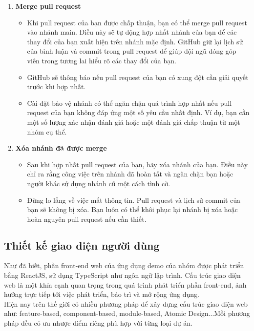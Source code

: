 \begin{enumerate}
    \item \textbf{Merge pull request}
    \begin{itemize}
        \item Khi pull request của bạn được chấp thuận, bạn có thể merge pull request vào nhánh main. Điều này sẽ tự động hợp nhất nhánh của bạn để các thay đổi của bạn xuất hiện trên nhánh mặc định. GitHub giữ lại lịch sử của bình luận và commit trong pull request để giúp đội ngũ đóng góp viên trong tương lai hiểu rõ các thay đổi của bạn.
        \item GitHub sẽ thông báo nếu pull request của bạn có xung đột cần giải quyết trước khi hợp nhất. 
        \item Cài đặt bảo vệ nhánh có thể ngăn chặn quá trình hợp nhất nếu pull request của bạn không đáp ứng một số yêu cầu nhất định. Ví dụ, bạn cần một số lượng xác nhận đánh giá hoặc một đánh giá chấp thuận từ một nhóm cụ thể.
    \end{itemize}

    \item \textbf{Xóa nhánh đã được merge}
    \begin{itemize}
        \item Sau khi hợp nhất pull request của bạn, hãy xóa nhánh của bạn. Điều này chỉ ra rằng công việc trên nhánh đã hoàn tất và ngăn chặn bạn hoặc người khác sử dụng nhánh cũ một cách tình cờ.
        \item Đừng lo lắng về việc mất thông tin. Pull request và lịch sử commit của bạn sẽ không bị xóa. Bạn luôn có thể khôi phục lại nhánh bị xóa hoặc hoàn nguyên pull request nếu cần thiết.
    \end{itemize}    
\end{enumerate}

\subsection{Thiết kế giao diện người dùng}
Như đã biết, phần front-end web của ứng dụng demo của nhóm được phát triển bằng ReactJS, sử dụng TypeScript như ngôn ngữ lập trình. Cấu trúc giao diện web là một khía cạnh quan trọng trong quá trình phát triển phần front-end, ảnh hưởng trực tiếp tới việc phát triển, bảo trì và mở rộng ứng dụng.\\

Hiện nay trên thế giới có nhiều phương pháp để xây dựng cấu trúc giao diện web như: feature-based, component-based, module-based, Atomic Design...Mỗi phương pháp đều có ưu nhược điểm riêng phù hợp với từng loại dự án.\\

